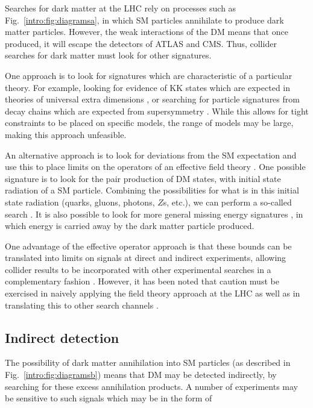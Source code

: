 Searches for dark matter at the LHC  rely on processes such as Fig.~\ref{intro:fig:diagramsa}, in which SM particles annihilate to produce dark matter particles. However, the weak interactions of the DM means that once produced, it will escape the detectors of ATLAS and CMS. Thus, collider searches for dark matter must look for other signatures. 

One approach is to look for signatures which are characteristic of a particular theory. For example, looking for evidence of KK states which are expected in theories of universal extra dimensions \cite{Edelhauser:2013, Kakuda:2013}, or searching for particle signatures from decay chains which are expected from supersymmetry \cite{ATLAS:2013, CMS:2013}. While this allows for tight constraints to be placed on specific models, the range of models may be large, making this approach unfeasible. 

An alternative approach is to look for deviations from the SM expectation and use this to place limits on the operators of an effective field theory \cite{Someone}. One possible signature is to look for the pair production of DM states, with initial state radiation of a SM particle. Combining the possibilities for what is in this initial state radiation (quarks, gluons, photons, $Z$s, etc.), we can perform a so-called  search \cite{Zhou:2013}.  It is also possible to look for more general missing energy signatures \cite{Fox:2011}, in which energy is carried away by the dark matter particle produced. 

One advantage of the effective operator approach is that these bounds can be translated into limits on signals at direct and indirect experiments, allowing collider results to be incorporated with other experimental searches in a complementary fashion \cite{Baer:2009}. However, it has been noted that caution must be exercised in naively applying the field theory approach at the LHC as well as in translating this to other search channels \cite{Buchmueller:2013,Busoni:2013}. 

\subsection{Indirect detection}


The possibility of dark matter annihilation into SM particles (as described in Fig.~\ref{intro:fig:diagramsb}) means that DM may be detected indirectly, by searching for these excess annihilation products. A number of experiments may be sensitive to such signals which may be in the form of

